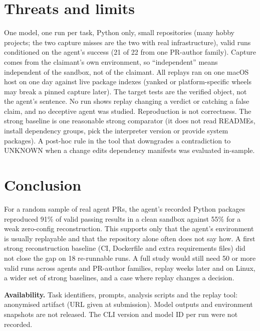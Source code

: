 \documentclass[10pt,conference]{IEEEtran}
\begin{document}
\section{Threats and limits}
One model, one run per task, Python only, small repositories (many hobby projects; the two capture misses are the two with real infrastructure), valid runs conditioned on the agent's success (21 of 22 from one PR-author family). Capture comes from the claimant's own environment, so ``independent'' means independent of the sandbox, not of the claimant. All replays ran on one macOS host on one day against live package indexes (yanked or platform-specific wheels may break a pinned capture later). The target tests are the verified object, not the agent's sentence. No run shows replay changing a verdict or catching a false claim, and no deceptive agent was studied. Reproduction is not correctness. The strong baseline is one reasonable strong comparator (it does not read READMEs, install dependency groups, pick the interpreter version or provide system packages). A post-hoc rule in the tool that downgrades a contradiction to UNKNOWN when a change edits dependency manifests was evaluated in-sample.

\section{Conclusion}
For a random sample of real agent PRs, the agent's recorded Python packages reproduced 91\% of valid passing results in a clean sandbox against 55\% for a weak zero-config reconstruction. This supports only that the agent's environment is usually replayable and that the repository alone often does not say how. A first strong reconstruction baseline (CI, Dockerfile and extra requirements files) did not close the gap on 18 re-runnable runs. A full study would still need 50 or more valid runs across agents and PR-author families, replay weeks later and on Linux, a wider set of strong baselines, and a case where replay changes a decision.

\textbf{Availability.} Task identifiers, prompts, analysis scripts and the replay tool: anonymised artifact (URL given at submission). Model outputs and environment snapshots are not released. The CLI version and model ID per run were not recorded.
\end{document}
